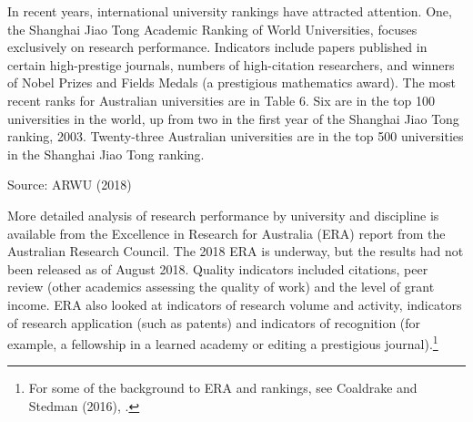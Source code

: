 \documentclass{grattan}
\begin{document}
In recent years, international university rankings have attracted attention. One, the Shanghai Jiao Tong Academic Ranking of World Universities, focuses exclusively on research performance. Indicators include papers published in certain high-prestige journals, numbers of high-citation researchers, and winners of Nobel Prizes and Fields Medals (a prestigious mathematics award). The most recent ranks for Australian universities are in Table 6. Six are in the top 100 universities in the world, up from two in the first year of the Shanghai Jiao Tong ranking, 2003. Twenty-three Australian universities are in the top 500 universities in the Shanghai Jiao Tong ranking.

\begin{table} \caption{Top eight Australian universities, Shanghai Jiao Tong university rankings, 2018}


\end{table}

Source: ARWU (2018)

More detailed analysis of research performance by university and discipline is available from the Excellence in Research for Australia (ERA) report from the Australian Research Council. The 2018 ERA is underway, but the results had not been released as of August 2018. Quality indicators included citations, peer review (other academics assessing the quality of work) and the level of grant income. ERA also looked at indicators of research volume and activity, indicators of research application (such as patents) and indicators of recognition (for example, a fellowship in a learned academy or editing a prestigious journal).\footnote{For some of the background to ERA and rankings, see Coaldrake and Stedman (2016), .}
\end{document}
